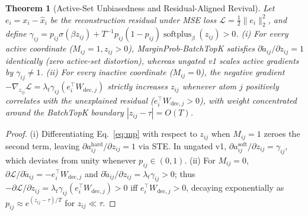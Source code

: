 \documentclass[10pt]{article}
\newtheorem{theorem}{Theorem}
\begin{document}
\begin{theorem}[Active-Set Unbiasedness and Residual-Aligned Revival]
Let $e_i = x_i - \hat{x}_i$ be the reconstruction residual under MSE loss $\mathcal{L} = \frac{1}{2}\|e_i\|_2^2$, and define $\gamma_{ij} = p_{ij}\sigma(\beta z_{ij}) + T^{-1} p_{ij}(1-p_{ij})\operatorname{softplus}_\beta(z_{ij}) > 0$.
(i) For every active coordinate ($M_{ij}=1, z_{ij}>0$), MarginProb-BatchTopK satisfies $\partial \tilde{a}_{ij}/\partial z_{ij} = 1$ identically (zero active-set distortion), whereas ungated v1 scales active gradients by $\gamma_{ij} \ne 1$.
(ii) For every inactive coordinate ($M_{ij}=0$), the negative gradient $-\nabla_{z_{ij}}\mathcal{L} = \lambda_t \gamma_{ij} (e_i^\top W_{\mathrm{dec},j})$ strictly increases $z_{ij}$ whenever atom $j$ positively correlates with the unexplained residual ($e_i^\top W_{\mathrm{dec},j} > 0$), with weight concentrated around the BatchTopK boundary $|z_{ij} - \tau| = O(T)$.
\end{theorem}
\begin{proof}
(i) Differentiating Eq.~\eqref{eq:mp} with respect to $z_{ij}$ when $M_{ij}=1$ zeroes the second term, leaving $\partial a_{ij}^{\mathrm{hard}}/\partial z_{ij} = 1$ via STE. In ungated v1, $\partial a_{ij}^{\mathrm{soft}}/\partial z_{ij} = \gamma_{ij}$, which deviates from unity whenever $p_{ij} \in (0,1)$.
(ii) For $M_{ij}=0$, $\partial \mathcal{L}/\partial \tilde{a}_{ij} = -e_i^\top W_{\mathrm{dec},j}$ and $\partial \tilde{a}_{ij}/\partial z_{ij} = \lambda_t \gamma_{ij} > 0$; thus $-\partial \mathcal{L}/\partial z_{ij} = \lambda_t \gamma_{ij}(e_i^\top W_{\mathrm{dec},j}) > 0$ iff $e_i^\top W_{\mathrm{dec},j} > 0$, decaying exponentially as $p_{ij} \approx e^{(z_{ij}-\tau)/T}$ for $z_{ij} \ll \tau$.
\end{proof}
\end{document}
